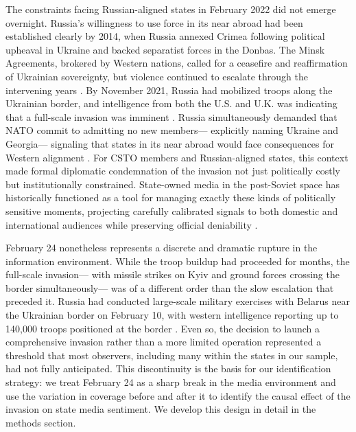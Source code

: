 \documentclass[12pt]{article}
\begin{document}
The constraints facing Russian-aligned states in February 2022 did not emerge overnight. Russia's willingness to use force in its near abroad had been established clearly by 2014, when Russia annexed Crimea following political upheaval in Ukraine and backed separatist forces in the Donbas. The Minsk Agreements, brokered by Western nations, called for a ceasefire and reaffirmation of Ukrainian sovereignty, but violence continued to escalate through the intervening years \citep{walker_conflict_2023}. By November 2021, Russia had mobilized troops along the Ukrainian border, and intelligence from both the U.S. and U.K. was indicating that a full-scale invasion was imminent \citep{walker_conflict_2023}. Russia simultaneously demanded that NATO commit to admitting no new members--- explicitly naming Ukraine and Georgia--- signaling that states in its near abroad would face consequences for Western alignment \citep{al_jazeera_us_2022}. For CSTO members and Russian-aligned states, this context made formal diplomatic condemnation of the invasion not just politically costly but institutionally constrained. State-owned media in the post-Soviet space has historically functioned as a tool for managing exactly these kinds of politically sensitive moments, projecting carefully calibrated signals to both domestic and international audiences while preserving official deniability \citep{cohen_theatre_1987, oates_television_2006, guriev_spin_2022}.

February 24 nonetheless represents a discrete and dramatic rupture in the information environment. While the troop buildup had proceeded for months, the full-scale invasion--- with missile strikes on Kyiv and ground forces crossing the border simultaneously--- was of a different order than the slow escalation that preceded it. Russia had conducted large-scale military exercises with Belarus near the Ukrainian border on February 10, with western intelligence reporting up to 140,000 troops positioned at the border \citep{walker_conflict_2024}. Even so, the decision to launch a comprehensive invasion rather than a more limited operation represented a threshold that most observers, including many within the states in our sample, had not fully anticipated. This discontinuity is the basis for our identification strategy: we treat February 24 as a sharp break in the media environment and use the variation in coverage before and after it to identify the causal effect of the invasion on state media sentiment. We develop this design in detail in the methods section.
\end{document}
